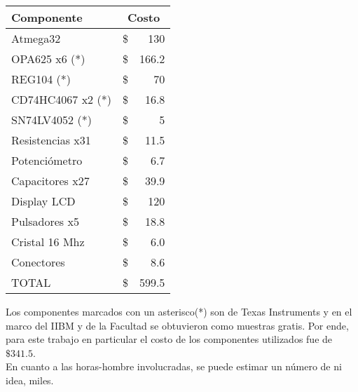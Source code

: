 \begin{table}[H]
\begin{center}
\begin{tabular}{|l|rr|}
    \hline
    \textbf{Componente} & \multicolumn{2}{c|}{\textbf{Costo}} \\ \hline
    Atmega32            & \hspace{2.8cm}\$ &   130 \\ \hline
    OPA625 x6 (*)       & \$               &   166.2 \\ \hline
    REG104 (*)          & \$               &   70 \\ \hline
    CD74HC4067 x2 (*)   & \$               &   16.8 \\ \hline
    SN74LV4052 (*)      & \$               &   5 \\ \hline
    Resistencias x31    & \$               &   11.5 \\ \hline
    Potenciómetro       & \$               &   6.7 \\ \hline
    Capacitores x27     & \$               &   39.9 \\ \hline
    Display LCD         & \$               &   120 \\ \hline
    Pulsadores x5       & \$               &   18.8 \\ \hline
    Cristal 16 Mhz      & \$               &   6.0 \\ \hline 
    Conectores          & \$               &   8.6 \\ \hline       
    TOTAL               & \$               &   599.5 \\ \hline
\end{tabular}
\end{center}
\end{table}

Los componentes marcados con un asterisco(*) son de Texas Instruments y en el marco del IIBM y de la Facultad se obtuvieron como muestras gratis. Por ende, para este trabajo en particular el costo de los componentes utilizados fue de $\$ 341.5$.\\

En cuanto a las horas-hombre involucradas, se puede estimar un número de \color{red}ni idea, miles\color{black}. 



